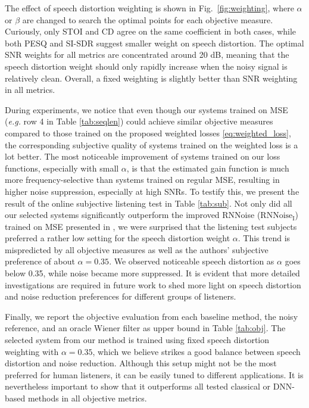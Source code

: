 \documentclass{article}
\begin{document}
The effect of speech distortion weighting is shown in Fig.~\ref{fig:weighting}, where $\alpha$ or $\beta$ are changed to search the optimal points for each objective measure. Curiously, only \ac{STOI} and \ac{CD} agree on the same coefficient in both cases, while both \ac{PESQ} and \ac{SI-SDR} suggest smaller weight on speech distortion. The optimal SNR weights for all metrics are concentrated around 20 dB, meaning that the speech distortion weight should only rapidly increase when the noisy signal is relatively clean. Overall, a fixed weighting is slightly better than SNR weighting in all metrics.

During experiments, we notice that even though our systems trained on \ac{MSE} (\emph{e.g.} row 4 in Table \ref{tab:seqlen}) could achieve similar objective measures compared to those trained on the proposed weighted losses \eqref{eq:weighted_loss}, the corresponding subjective quality of systems trained on the weighted loss is a lot better. The most noticeable improvement of systems trained on our loss functions, especially with small $\alpha$, is that the estimated gain function is much more frequency-selective than systems trained on regular \ac{MSE}, resulting in higher noise suppression, especially at high SNRs. To testify this, we present the result of the online subjective listening test in Table \ref{tab:sub}. Not only did all our selected systems significantly outperform the improved RNNoise ($\text{RNNoise}_\text{I}$) trained on \ac{MSE} presented in \cite{Reddy2019}, we were surprised that the listening test subjects preferred a rather low setting for the speech distortion weight $\alpha$. This trend is mispredicted by all objective measures as well as the authors' subjective preference of about $\alpha= 0.35$. We observed noticeable speech distortion as $\alpha$ goes below 0.35, while noise became more suppressed. It is evident that more detailed investigations are required in future work to shed more light on speech distortion and noise reduction preferences for different groups of listeners.

Finally, we report the objective evaluation from each baseline method, the noisy reference, and an oracle Wiener filter as upper bound in Table \ref{tab:obj}. The selected system from our method is trained using fixed speech distortion weighting with $\alpha=0.35$, which we believe strikes a good balance between speech distortion and noise reduction. Although this setup might not be the most preferred for human listeners, it can be easily tuned to different applications. It is nevertheless important to show that it outperforms all tested classical or DNN-based methods in all objective metrics.
\end{document}

